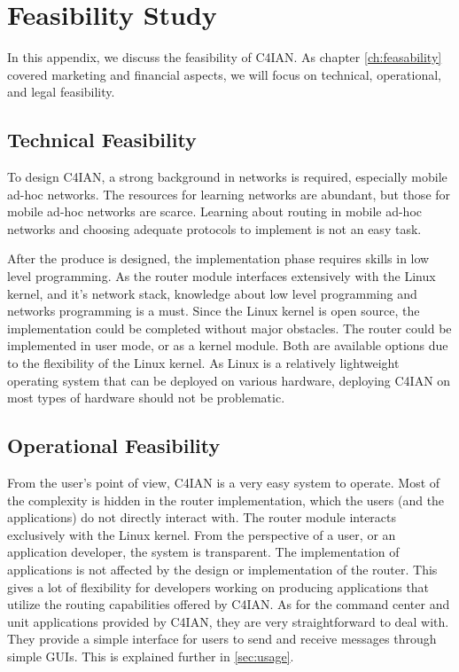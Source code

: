 \chapter{Feasibility Study}

\quad  In this appendix, we discuss the feasibility of C4IAN. 
As chapter \ref{ch:feasability} covered marketing and financial aspects, we will focus on technical, operational, and legal feasibility.

\section{Technical Feasibility}

\quad To design C4IAN, a strong background in networks is required, especially mobile ad-hoc networks. The resources for learning networks are abundant, but those for mobile ad-hoc networks are scarce. Learning about routing in mobile ad-hoc networks and choosing adequate protocols to implement is not an easy task.

After the produce is designed, the implementation phase requires skills in low level programming. As the router module interfaces extensively with the Linux kernel, and it's network stack, knowledge about low level programming and networks programming is a must. Since the Linux kernel is open source, the implementation could be completed without major obstacles. The router could be implemented in user mode, or as a kernel module. Both are available options due to the flexibility of the Linux kernel. As Linux is a relatively lightweight operating system that can be deployed on various hardware, deploying C4IAN on most types of hardware should not be problematic.

\section{Operational Feasibility}

\quad From the user's point of view, C4IAN is a very easy system to operate. Most of the complexity is hidden in the router implementation, which the users (and the applications) do not directly interact with. The router module interacts exclusively with the Linux kernel. From the perspective of a user, or an application developer, the system is transparent. The implementation of applications is not affected by the design or implementation of the router. This gives a lot of flexibility for developers working on producing applications that utilize the routing capabilities offered by C4IAN. As for the command center and unit applications provided by C4IAN, they are very straightforward to deal with. They provide a simple interface for users to send and receive messages through simple GUIs. This is explained further in \ref{sec:usage}.

